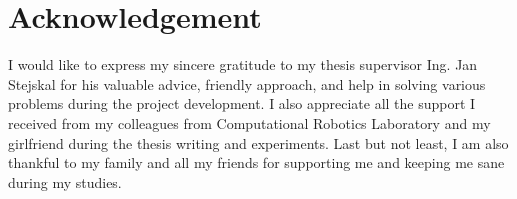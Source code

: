 %
\null \vfill{}
\section*{Acknowledgement}

I would like to express my sincere gratitude to my thesis supervisor Ing. Jan Stejskal for his valuable advice, friendly approach, and help in solving various problems during the project development.
%
I also appreciate all the support I received from my colleagues from Computational Robotics Laboratory and my girlfriend during the thesis writing and experiments.
%
Last but not least, I am also thankful to my family and all my friends for supporting me and keeping me sane during my studies.